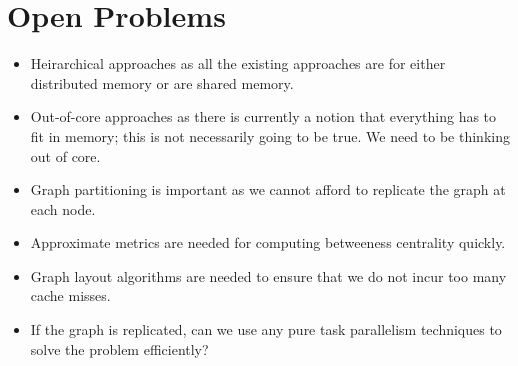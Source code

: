\section{Open Problems}
\label{sec:open_problems}

\begin{itemize}
\item Heirarchical approaches as all the existing approaches are for either 
distributed memory or are shared memory.
\item Out-of-core approaches as there is currently a notion that everything 
has to fit in memory; this is not necessarily going to be true. We need to 
be thinking out of core.
\item Graph partitioning is important as we cannot afford to replicate the 
graph at each node.
\item Approximate metrics are needed for computing betweeness centrality 
quickly.
\item Graph layout algorithms are needed to ensure that we do not incur too 
many cache misses.
\item If the graph is replicated, can we use any pure task parallelism 
techniques to solve the problem efficiently?
\end{itemize}
